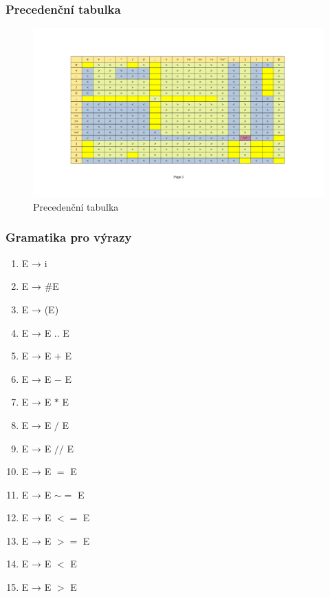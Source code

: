 \documentclass[a4paper, 12pt]{article}
\begin{document}
\subsubsection{Precedenční tabulka}
\begin{figure}[ht!]
\begin{center}
  \includegraphics[width=1\textwidth, trim={0 2.5cm 0 0},clip]{images/precedence_table.pdf}
  \caption{Precedenční tabulka}
\end{center}
\end{figure}

\newpage

\subsubsection{Gramatika pro výrazy}

\begin{enumerate}
    \item E → i
    \item E → $\#$E
    \item E → (E)
    \item E → E $..$ E
    \item E → E $+$ E
    \item E → E $-$ E
    \item E → E $*$ E
    \item E → E $/$ E
    \item E → E $//$ E
    \item E → E $=$ E
    \item E → E $\sim=$ E
    \item E → E $<=$ E
    \item E → E $>=$ E
    \item E → E $<$ E
    \item E → E $>$ E
\end{enumerate}
\end{document}
